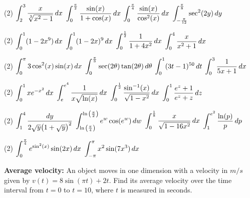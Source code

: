 \documentclass[mathNotesPreamble]{subfiles}
\begin{document}
  \begin{tasks}[after-item-skip=\stretch{1}, resume](2)
    \task $\ds\int_2^3 \frac{x}{\sqrt[3]{x^2-1}}\,dx$
    \task $\ds\int_{0}^{\frac{\pi}{2}} \frac{\sin(x)}{1+\cos(x)}\,dx$
    \task $\ds\int_0^{\frac{\pi}{4}} \frac{\sin(x)}{\cos^2(x)}\,dx$
    \task $\ds\int_{-\frac{\pi}{12}}^{\frac{\pi}{8}} \sec^2(2y)\,dy$
  \end{tasks}
  \pagebreak
  
  \begin{tasks}[after-item-skip=\stretch{1}, resume](2)
    \task $\ds\int_0^1 (1-2x^9)\,dx$
    \task $\ds\int_0^1 (1-2x)^9\,dx$
    \task $\ds\int_0^{\frac{1}{2}} \frac{1}{1+4x^2}\,dx$
    \task $\ds\int_0^4 \frac{x}{x^2+1}\,dx$
  \end{tasks}
  \pagebreak
  
  \begin{tasks}[after-item-skip=\stretch{1}, resume](2)
    \task $\ds\int_0^\pi 3\cos^2(x)\sin(x)\,dx$
    \task $\ds\int_0^{\frac{\pi}{8}} \sec(2\theta)\tan(2\theta)\,d\theta$
    \task $\ds\int_0^1 (3t-1)^{50}\,dt$
    \task $\ds\int_0^3 \frac{1}{5x+1}\,dx$
  \end{tasks}
  \pagebreak
  
  \begin{tasks}[after-item-skip=\stretch{1}, resume](2)
    \task $\ds\int_0^1 xe\inv[x^2]\,dx$
    \task $\ds\int_e^{e^4} \frac{1}{x\sqrt{\ln(x)}}\,dx$
    \task $\ds\int_0^{\frac{1}{2}} \frac{\sin\inv(x)}{\sqrt{1-x^2}}\,dx$
    \task $\ds\int_0^1 \frac{e^z+1}{e^z+z}\,dz$
  \end{tasks}
  \pagebreak
  
  \begin{tasks}[after-item-skip=\stretch{1}, resume](2)
    \task $\ds\int_1^4 \frac{dy}{2\sqrt{y}\parens{1+\sqrt{y}}^2}$
    \task $\ds\int_{\ln\parens{\frac{\pi}{4}}}^{\ln\parens{\frac{\pi}{2}}} e^w\cos(e^w)\,dw$
    \task $\ds\int_0^{\frac{1}{8}} \frac{x}{\sqrt{1-16x^2}}\,dx$
    \task $\ds\int_1^{e^2} \frac{\ln(p)}{p}\,dp$
  \end{tasks}
  \pagebreak
  
  \begin{tasks}[after-item-skip=\stretch{1}, resume](2)
    \task $\ds\int_0^{\frac{\pi}{4}} e^{\sin^2(x)}\sin(2x)\,dx$
    \task $\ds\int_{-\pi}^{\pi} x^2\sin(7x^3)\,dx$
  \end{tasks}
  \begin{ex*}
    \textbf{Average velocity:} An object moves in one dimension with a velocity in $m/s$ given by $v(t)=8\sin(\pi t)+2t$. Find its average velocity over the time interval from $t=0$ to $t=10$, where $t$ is measured in seconds.
  \end{ex*}
  \pagebreak
  
\end{document}
